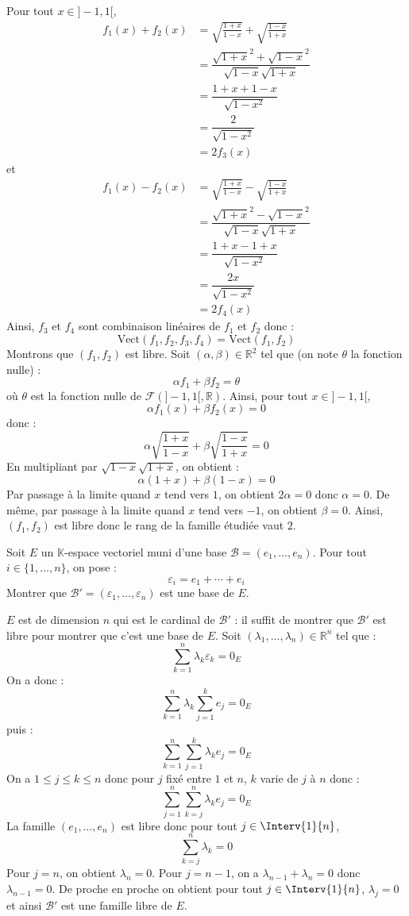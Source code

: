 \documentclass[a4paper,10pt]{report}
\begin{document}
\corr Pour tout $x \in ]-1,1[$,
\begin{align*}
 f_1(x)+f_2(x) & = \sqrt {\frac{1 + x}{1 - x}} + \sqrt {\frac{1 - x}{1 + x}}  \\
 & = \dfrac{\sqrt{1+x}^2 + \sqrt{1-x}^2}{\sqrt{1-x}\sqrt{1+x}} \\
 & = \dfrac{1+x+1-x}{\sqrt{1-x^2}}\\
 & = \dfrac{2}{\sqrt{1-x^2}}\\
 & = 2 f_3(x)
 \end{align*}
et 
\begin{align*}
 f_1(x)-f_2(x) & = \sqrt {\frac{1 + x}{1 - x}} - \sqrt {\frac{1 - x}{1 + x}}  \\
 & = \dfrac{\sqrt{1+x}^2 - \sqrt{1-x}^2}{\sqrt{1-x}\sqrt{1+x}} \\
 & = \dfrac{1+x-1+x}{\sqrt{1-x^2}}\\
 & = \dfrac{2x}{\sqrt{1-x^2}}\\
 & = 2 f_4(x)
 \end{align*}
 Ainsi, $f_3$ et $f_4$ sont combinaison linéaires de $f_1$ et $f_2$ donc :
 $$ \textrm{Vect}(f_1,f_2,f_3,f_4) = \textrm{Vect}(f_1,f_2)$$
Montrons que $(f_1,f_2)$ est libre. Soit $(\alpha, \beta) \in \mathbb{R}^2$ tel que (on note $\theta$ la fonction nulle) :
$$ \alpha f_1 + \beta f_2 = \theta$$
où $\theta$ est la fonction nulle de $\mathcal{F}(]-1,1[, \mathbb{R})$. Ainsi, pour tout $x \in ]-1,1[$,
$$ \alpha f_1(x)+ \beta f_2(x) = 0$$
donc :
$$ \alpha \sqrt {\frac{1 + x}{1 - x}} +  \beta \sqrt {\frac{1 - x}{1 + x}} = 0$$
En multipliant par $\sqrt{1-x} \sqrt{1+x}$, on obtient :
$$ \alpha (1+x) + \beta (1-x) = 0$$
Par passage à la limite quand $x$ tend vers $1$, on obtient $2\alpha=0$ donc $\alpha=0$. De même, par passage à la limite quand $x$ tend vers $-1$, on obtient $\beta=0$. Ainsi, $(f_1,f_2)$ est libre donc le rang de la famille étudiée vaut $2$.

\medskip

\begin{Exa} Soit $E$ un $\mathbb{K}$-espace vectoriel muni d'une base $\mathcal{B} = (e_1 , \ldots ,e_n)$. Pour tout $i \in \lbrace 1, \ldots ,n \rbrace$, on pose :
$$\varepsilon_i = e_1 + \cdots + e_i$$
Montrer que $\mathcal{B}' = (\varepsilon_1 , \ldots ,\varepsilon_n)$ est une base de $E$.
\end{Exa} 

\corr $E$ est de dimension $n$ qui est le cardinal de $\mathcal{B}'$ : il suffit de montrer que $\mathcal{B}'$ est libre pour montrer que c'est une base de $E$. Soit $(\lambda_1, \ldots, \lambda_n) \in \mathbb{R}^n$ tel que :
$$ \sum_{k=1}^n \lambda_k \varepsilon_k = 0_E$$
On a donc :
$$ \sum_{k=1}^n \lambda_k  \sum_{j=1}^k e_j = 0_E$$
puis : 
$$ \sum_{k=1}^n   \sum_{j=1}^k \lambda_k e_j = 0_E$$
On a $1 \leq j \leq k \leq n$ donc pour $j$ fixé entre $1$ et $n$, $k$ varie de $j$ à $n$ donc :
$$ \sum_{j=1}^n   \sum_{k=j}^n \lambda_k e_j = 0_E$$
La famille $(e_1, \ldots, e_n)$ est libre donc pour tout $j \in \Interv{1}{n}$,
$$ \sum_{k=j}^n \lambda_k = 0$$
Pour $j=n$, on obtient $\lambda_n=0$. Pour $j=n-1$, on a $\lambda_{n-1}+\lambda_n=0$ donc $\lambda_{n-1}=0$. De proche en proche on obtient pour tout $j \in \Interv{1}{n}$, $\lambda_j=0$ et ainsi $\mathcal{B}'$ est une famille libre de $E$.
\end{document}
